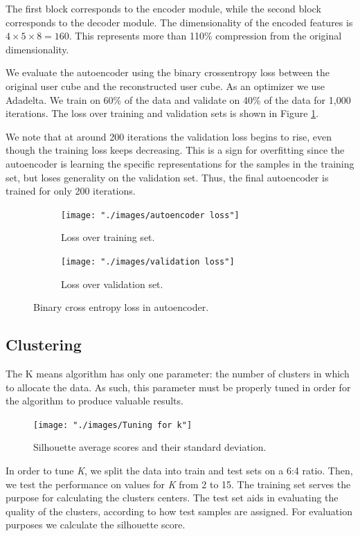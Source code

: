 \documentclass{article}
\begin{document}
The first block corresponds to the encoder module, while the second block corresponds to the decoder module. The dimensionality of the encoded features is $4 \times 5 \times 8 = 160$. This represents more than 110\% compression from the original dimensionality. 

We evaluate the autoencoder using the binary crossentropy loss between the original user cube and the reconstructed user cube. As an optimizer we use Adadelta. We train on 60\% of the data and validate on 40\% of the data for 1,000 iterations. The loss over training and validation sets is shown in Figure \ref{fig:clustering/loss}.

We note that at around 200 iterations the validation loss begins to rise, even though the training loss keeps decreasing. This is a sign for overfitting since the autoencoder is learning the specific representations for the samples in the training set, but loses generality on the validation set. Thus, the final autoencoder is trained for only 200 iterations.

\begin{figure}[H]
  \centering
  \begin{subfigure}[b]{.9\textwidth}
  	\centering
	\texttt{[image: "./images/autoencoder loss"]}
  \caption{Loss over training set.}
  \end{subfigure}
  \begin{subfigure}[b]{.9\textwidth}
  	\centering
	\texttt{[image: "./images/validation loss"]}
  \caption{Loss over validation set.}
  \end{subfigure}
  \caption{Binary cross entropy loss in autoencoder.}
  	\label{fig:clustering/loss} 
\end{figure}

\subsection{Clustering}
The K means algorithm has only one parameter: the number of clusters in which to allocate the data. As such, this parameter must be properly tuned in order for the algorithm to produce valuable results. 

\begin{figure}[H]
  \centering
  \texttt{[image: "./images/Tuning for k"]}
  \caption{Silhouette average scores and their standard deviation.}
  \label{fig:clustering/tuning}
\end{figure}

In order to tune \textit{K}, we split the data into train and test sets on a 6:4 ratio. Then, we test the performance on values for \textit{K} from 2 to 15. The training set serves the purpose for calculating the clusters centers. The test set aids in evaluating the quality of the clusters, according to how test samples are assigned. For evaluation purposes we calculate the silhouette score. 
\end{document}
